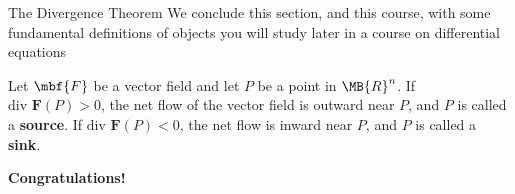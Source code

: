 \documentclass[11pt,english,
handout
]{beamer}
\begin{document}
\begin{frame}[t]{The Divergence Theorem}
\small
We conclude this section, and this course, with some fundamental definitions of objects you will study later in a course on differential equations

\lspace
\begin{definition}
Let $\mbf{F}$ be a vector field and let $P$ be a point in $\MB{R}^n$. If $\text{div }\mathbf{F}(P)>0$, the net flow of the vector field is outward near $P$, and $P$ is called a \textbf{source}. If $\text{div }\mathbf{F}(P)<0$, the net flow is inward near $P$, and $P$ is called a \textbf{sink}.
\end{definition}
\end{frame}














\begin{frame}
\begin{center}
{\Huge \bf Congratulations!}

\vspace{2cm}

\end{center}
\end{frame}
\end{document}
